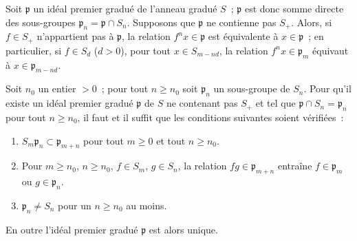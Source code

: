 \begin{env}[2.1.8]
\label{II.2.1.8-fr}
Soit $\mathfrak{p}$ un idéal premier gradué de l'anneau gradué $S$~;
$\mathfrak{p}$ est donc somme directe des sous-groupes
$\mathfrak{p}_n=\mathfrak{p}\cap S_n$. Supposons que $\mathfrak{p}$ ne
contienne pas $S_+$. Alors, si $f\in S_+$ n'appartient pas à
$\mathfrak{p}$, la relation $f^nx\in\mathfrak{p}$ est équivalente à
$x\in\mathfrak{p}$~; en particulier, si $f\in S_d$ ($d>0$), pour tout
$x\in S_{m-nd}$, la relation $f^nx\in\mathfrak{p}_m$ équivaut à
$x\in\mathfrak{p}_{m-nd}$.
\end{env}

\begin{proposition}[2.1.9]
\label{II.2.1.9-fr}
Soit $n_0$ un entier $>0$~; pour tout $n\geq n_0$ soit $\mathfrak{p}_n$ un
sous-groupe de $S_n$. Pour qu'il existe un idéal premier gradué
$\mathfrak{p}$ de $S$ ne contenant pas $S_+$ et tel que
$\mathfrak{p}\cap S_n=\mathfrak{p}_n$ pour tout $n\geq n_0$, il faut et il
suffit que les conditions suivantes soient vérifiées~:
\begin{enumerate}
  \item[$1^\circ$] $S_m\mathfrak{p}_n\subset\mathfrak{p}_{m+n}$ pour tout
    $m\geq 0$ et tout $n\geq n_0$.
  \item[$2^\circ$] Pour $m\geq n_0$, $n\geq n_0$, $f\in S_m$, $g\in S_n$,
    la relation $fg\in\mathfrak{p}_{m+n}$ entraîne
    $f\in\mathfrak{p}_m$ ou $g\in\mathfrak{p}_n$.
  \item[$3^\circ$] $\mathfrak{p}_n\neq S_n$ pour un $n\geq n_0$ au moins.
\end{enumerate}
En outre l'idéal premier gradué $\mathfrak{p}$ est alors unique.
\end{proposition}

